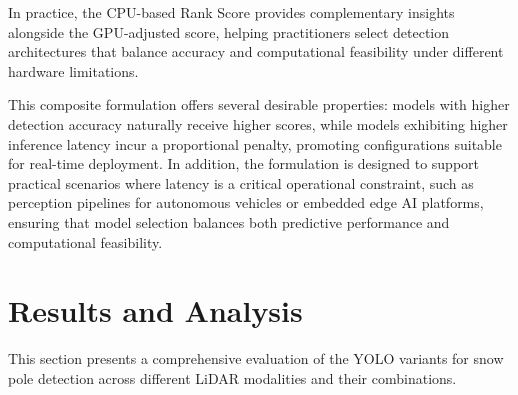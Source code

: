 \documentclass[runningheads]{llncs}
\begin{document}
In practice, the CPU-based Rank Score provides complementary insights alongside the GPU-adjusted score, helping practitioners select detection architectures that balance accuracy and computational feasibility under different hardware limitations.

This composite formulation offers several desirable properties: models with higher detection accuracy naturally receive higher scores, while models exhibiting higher inference latency incur a proportional penalty, promoting configurations suitable for real-time deployment. In addition, the formulation is designed to support practical scenarios where latency is a critical operational constraint, such as perception pipelines for autonomous vehicles or embedded edge AI platforms, ensuring that model selection balances both predictive performance and computational feasibility.




\section{Results and Analysis}

This section presents a comprehensive evaluation of the YOLO variants for snow pole detection across different LiDAR modalities and their combinations.
\end{document}
